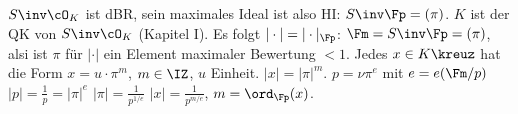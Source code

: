 \begin{Beweis}
\begin{itemize}
  $S\inv\cO_K$ ist dBR, sein maximales Ideal ist also HI: $S\inv\Fp=(\pi)$. $K$ ist der QK von $S\inv\cO_K$ (Kapitel I). Es folgt $|\cdot|=|\cdot|_\Fp$:
  $\Fm=S\inv\Fp=(\pi)$, alsi ist $\pi$ für $|\cdot|$ ein Element maximaler Bewertung $<1$. Jedes $x\in K\kreuz$ hat die Form $x=u\cdot \pi^m$, $m\in\IZ$, $u$ Einheit.
  \folge $|x|=|\pi|^m$. $p=\nu\pi^e$ mit $e=e(\Fm/p)$ \folge $|p|=\frac{1}{p}=|\pi|^e$ \folge $|\pi|=\frac{1}{p^{1/e}}$ \folge $|x|=\frac{1}{p^{m/e}}$, $m=\ord_\Fp(x)$.
  \end{itemize}
\end{Beweis}





